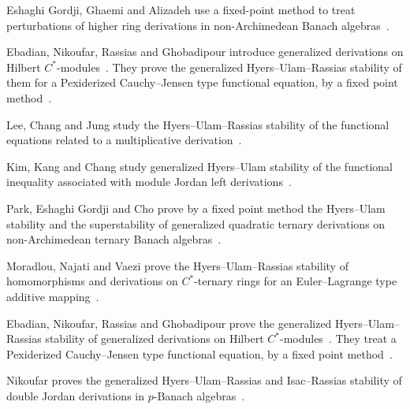 Eshaghi Gordji, Ghaemi and Alizadeh use a fixed-point method to treat
perturbations of higher ring derivations in non-Archimedean Banach
algebras~\cite{WlAFixedPointMethodForPerturbati2011}.

Ebadian, Nikoufar, Rassias and Ghobadipour introduce generalized derivations
on Hilbert $C^*$-modules~\cite{WlStabilityOfGeneralizedDerivati2012}. They prove the generalized Hyers--Ulam--Rassias
stability of them for a Pexiderized Cauchy--Jensen type functional equation, by
a fixed point method~\cite{WlStabilityOfGeneralizedDerivati2012}.

Lee, Chang and Jung study the Hyers--Ulam--Rassias stability of the functional
equations related to a multiplicative
derivation~\cite{WlOnStabilityOfTheFunctionalEqua2007}.

Kim, Kang and Chang study generalized Hyers--Ulam stability of the functional
inequality associated with module Jordan left
derivations~\cite{WlOnFunctionalInequalitiesOrigin2008}.

Park, Eshaghi Gordji and Cho prove by a fixed point method the Hyers--Ulam
stability and the superstability of generalized quadratic ternary derivations
on non-Archimedean ternary Banach
algebras~\cite{WlStabilityAndSuperstabilityOfGe2012}.

Moradlou, Najati and Vaezi prove the Hyers--Ulam--Rassias stability of
homomorphisms and derivations on $C^*$-ternary rings for an Euler--Lagrange
type additive mapping~\cite{WlStabilityOfHomomorphismsAndDer2020}.

Ebadian, Nikoufar, Rassias and Ghobadipour prove the generalized
Hyers--Ulam--Rassias stability of generalized derivations on Hilbert
$C^*$-modules~\cite{WlStabilityOfGeneralizedDerivati2020}. They treat a Pexiderized Cauchy--Jensen type functional
equation, by a fixed point
method~\cite{WlStabilityOfGeneralizedDerivati2020}.

Nikoufar proves the generalized Hyers--Ulam--Rassias and Isac--Rassias
stability of double Jordan derivations in $p$-Banach
algebras~\cite{WlFunctionsNearSome1212DoubleJor2020}.
